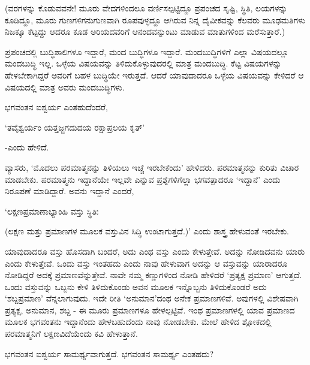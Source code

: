 (ವರಗಳನ್ನು ಕೊಡುವವನೇ! ಮೂರು ವೇದಗಳಿಂದಲೂ ವರ್ಣಿಸಲ್ಪಟ್ಟಿದ್ದೂ ಪ್ರಪಂಚದ ಸೃಷ್ಟಿ, ಸ್ಥಿತಿ, ಲಯಗಳನ್ನು ಕೂಡಿದ್ದೂ, ಮೂರು ಗುಣಗಳಿಗನುಗುಣವಾಗಿ ರೂಪವುಳ್ಳದ್ದೂ ಆಗಿರುವ ನಿನ್ನ ದೈವೀಕವನ್ನು ಕೆಲವರು ಮೂಢಮತಿಗಳು ನಿಜಕ್ಕೂ ಕೆಟ್ಟದ್ದು ಆದರೂ ಕೂಡ ಅರಿಯದವರಿಗೆ ಆನಂದವನ್ನುಂಟು ಮಾಡುವ ಮಾತುಗಳಿಂದ ಮರೆಸುತ್ತಾರೆ.)

ಪ್ರಪಂಚದಲ್ಲಿ ಬುದ್ಧಿಶಾಲಿಗಳೂ ಇದ್ದಾರೆ, ಮಂದ ಬುದ್ಧಿಗಳೂ ಇದ್ದಾರೆ. ಮಂದಬುದ್ಧಿಗಳಿಗೆ ಎಲ್ಲಾ ವಿಷಯದಲ್ಲೂ ಮಂದಬುದ್ಧಿ ಇಲ್ಲ. ಒಳ್ಳೆಯ ವಿಷಯವನ್ನು ತಿಳಿದುಕೊಳ್ಳುವುದರಲ್ಲಿ ಮಾತ್ರ ಮಂದಬುದ್ಧಿ. ಕೆಟ್ಟ ವಿಷಯಗಳನ್ನು ಹೇಳಬೇಕಾಗಿದ್ದರೆ ಅವರಿಗೆ ಬಹಳ ಬುದ್ಧಿಯೇ ಇರುತ್ತದೆ. ಆದರೆ ಯಾವುದಾದರೂ ಒಳ್ಳೆಯ ವಿಷಯವನ್ನು ಕೇಳಿದರೆ ಆ ವಿಷಯದಲ್ಲಿ ಮಾತ್ರ ಅವರು ಮಂದಬುದ್ಧಿಗಳು.

ಭಗವಂತನ ಐಶ್ವರ್ಯ ಎಂತಹುದೆಂದರೆ,

\begin{shloka}
`ತವೈಶ್ವರ್ಯಂ ಯತ್ತಜ್ಜಗದುದಯ ರಕ್ಷಾಪ್ರಲಯ ಕೃತ್'
\end{shloka}

-ಎಂದು ಹೇಳಿದೆ.

ವ್ಯಾಸರು, `ಮೊದಲು ಪರಮಾತ್ಮನನ್ನು ತಿಳಿಯಲು ಇಚ್ಚೆ ಇರಬೇಕೆಂದು' ಹೇಳಿದರು. ಪರಮಾತ್ಮನನ್ನು ಕುರಿತು ವಿಚಾರ ಮಾಡಬೇಕು. ಪರಮಾತ್ಮನು ಇದ್ದಾನೆಯೇ ಇಲ್ಲವೇ ಎನ್ನುವ ಪ್ರಶ್ನೆಗಳಿಗೆಲ್ಲಾ ಭಗವತ್ಪಾದರೂ `ಇದ್ದಾನೆ' ಎಂದು ನಿರೂಪಣೆ ಮಾಡಿದ್ದಾರೆ. ಅವನು ಇದ್ದಾನೆ ಎಂದರೆ,

\begin{shloka}
`ಲಕ್ಷಣಪ್ರಮಾಣಾಭ್ಯಾಂಹಿ ವಸ್ತು ಸ್ಥಿತಿಃ
\end{shloka}

(ಲಕ್ಷಣ ಮತ್ತು ಪ್ರಮಾಣಗಳ ಮೂಲಕ ವಸ್ತುವಿನ ಸಿದ್ಧಿ ಉಂಟಾಗುತ್ತದೆ.)' ಎಂದು ಶಾಸ್ತ್ರ ಹೇಳುವಂತೆ ಇರಬೇಕು.

ಯಾವುದಾದರೂ ವಸ್ತು ಹೊಸದಾಗಿ ಬಂದರೆ, ಅದು ಎಂಥ ವಸ್ತು ಎಂದು ಕೇಳುತ್ತೇವೆ. ಅದನ್ನು ನೋಡಿದವನು ಯಾರು ಎಂದು ಕೇಳುತ್ತೇವೆ. ಒಂದು ವಸ್ತು ಇಂತಹದು ಎಂದು ನಾವು ಹೇಳುವಾಗ ಅದನ್ನು ಆ ವಸ್ತುವನ್ನು ಯಾರಾದರೂ ನೋಡಿದ್ದರೆ ಅದಕ್ಕೆ ಪ್ರಮಾಣವೆನ್ನುತ್ತೇವೆ. ನಾವೇ ನಮ್ಮ ಕಣ್ಣುಗಳಿಂದ ನೋಡಿ ಹೇಳಿದರೆ `ಪ್ರತ್ಯಕ್ಷ ಪ್ರಮಾಣ' ಆಗುತ್ತದೆ. ಒಂದು ವಸ್ತುವನ್ನು ಒಬ್ಬನು ಕೇಳಿ ತಿಳಿದುಕೊಂಡು ಅವನ ಮೂಲಕ ಇನ್ನೊಬ್ಬನು ತಿಳಿದುಕೊಂಡರೆ ಅದು `ಶಬ್ದಪ್ರಮಾಣ' ವೆನ್ನಲಾಗುವುದು. ಇದೇ ರೀತಿ `ಅನುಮಾನ'ದಂಥ ಅನೇಕ ಪ್ರಮಾಣಗಳಿವೆ. ಅವುಗಳಲ್ಲಿ ವಿಶೇಷವಾಗಿ ಪ್ರತ್ಯಕ್ಷ, ಅನುಮಾನ, ಶಬ್ದ - ಈ ಮೂರು ಪ್ರಮಾಣಗಳೂ ಹೇಳಲ್ಪಟ್ಟಿವೆ. ಇಂಥ ಪ್ರಮಾಣಗಳಲ್ಲಿ ಯಾವ ಪ್ರಮಾಣದ ಮೂಲಕ ಭಗವಂತನು ಇದ್ದಾನೆಂದು ಹೇಳಬಹುದೆಂದು ನಾವು ನೋಡಬೇಕು. ಮೇಲೆ ಹೇಳಿದ ಶ್ಲೋಕದಲ್ಲಿ ಪರಮಾತ್ಮನಿಗೆ ಲಕ್ಷಣವಿದೆಯೆಂದು ಕವಿ ಹೇಳುತ್ತಾನೆ.

ಭಗವಂತನ ಐಶ್ವರ್ಯ ಸಾಮರ್ಥ್ಯವಾಗುತ್ತದೆ. ಭಗವಂತನ ಸಾಮರ್ಥ್ಯ ಎಂತಹದು?

